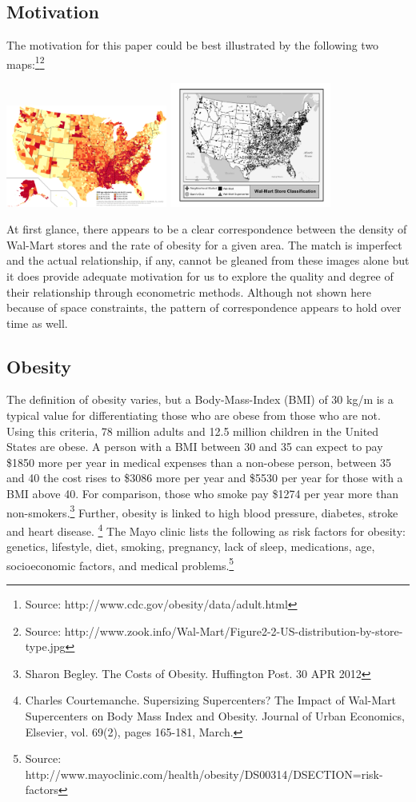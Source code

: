\fontsize{12bp}{14bp}\selectfont
\subsection{Motivation} 
The motivation for this paper could be best illustrated by the following two maps:\footnote{Source: http://www.cdc.gov/obesity/data/adult.html}\footnote{Source: http://www.zook.info/Wal-Mart/Figure2-2-US-distribution-by-store-type.jpg}

\includegraphics[width=200px]{obesity_by_county_large}
\includegraphics[width=200px]{walmartdistribution}

At first glance, there appears to be a clear correspondence between the density of Wal-Mart stores and the rate of obesity for a given area.  The match is imperfect and the actual relationship, if any, cannot be gleaned from these images alone but it does provide adequate motivation for us to explore the quality and degree of their relationship through econometric methods.  Although not shown here because of space constraints, the pattern of correspondence appears to hold over time as well.  
\subsection{Obesity}

The definition of obesity varies, but a Body-Mass-Index (BMI) of 30 kg/m is a typical value for differentiating those who are obese from those who are not.  Using this criteria, 78 million adults and 12.5 million children in the United States are obese.  A person with a BMI between 30 and 35 can expect to pay \$1850 more per year in medical expenses than a non-obese person, between 35 and 40 the cost rises to \$3086 more per year and \$5530 per year for those with a BMI above 40.  For comparison, those who smoke pay \$1274 per year more than non-smokers.\footnote{Sharon Begley. The Costs of Obesity. Huffington Post. 30 APR 2012}  Further, obesity is linked to high blood pressure, diabetes, stroke and heart disease. \footnote{Charles Courtemanche. Supersizing Supercenters? The Impact of Wal-Mart Supercenters on Body Mass Index and Obesity. Journal of Urban Economics, Elsevier, vol. 69(2), pages 165-181, March.} The Mayo clinic lists the following as risk factors for obesity:  genetics, lifestyle, diet, smoking, pregnancy, lack of sleep, medications, age, socioeconomic factors, and medical problems.\footnote{Source: http://www.mayoclinic.com/health/obesity/DS00314/DSECTION=risk-factors}  
